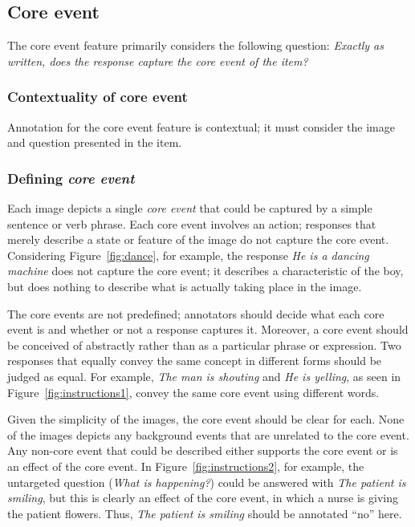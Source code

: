 \documentclass[12pt,notitlepage]{article}
\begin{document}
\subsection{Core event} \label{subsec:core-event}
The core event feature primarily considers the following question: \textit{Exactly as written, does the response capture the core event of the item?}

\subsubsection{Contextuality of core event} Annotation for the core event feature is contextual; it must consider the image and question presented in the item. 

\subsubsection{Defining \textit{core event}}
Each image depicts a single \textit{core event} that could be captured by a simple sentence or verb phrase. Each core event involves an action; responses that merely describe a state or feature of the image do not capture the core event. Considering Figure~\ref{fig:dance}, for example, the response \textit{He is a dancing machine} does not capture the core event; it describes a characteristic of the boy, but does nothing to describe what is actually taking place in the image.

The core events are not predefined; annotators should decide what each core event is and whether or not a response captures it. Moreover, a core event should be conceived of abstractly rather than as a particular phrase or expression. Two responses that equally convey the same concept in different forms should be judged as equal. For example, \textit{The man is shouting} and \textit{He is yelling}, as seen in Figure~\ref{fig:instructions1}, convey the same core event using different words.

Given the simplicity of the images, the core event should be clear for each. None of the images depicts any background events that are unrelated to the core event. Any non-core event that could be described either supports the core event or is an effect of the core event. In Figure~\ref{fig:instructions2}, for example, the untargeted question (\textit{What is happening?}) could be answered with \textit{The patient is smiling}, but this is clearly an effect of the core event, in which a nurse is giving the patient flowers. Thus, \textit{The patient is smiling} should be annotated ``no'' here.
\end{document}
